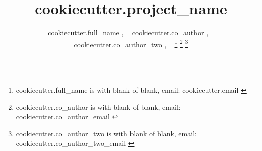 \title{ {{ cookiecutter.project_name }} }

\author{ {{ cookiecutter.full_name }}, ~
         {{ cookiecutter.co_author }}, ~
         {{ cookiecutter.co_author_two }}, ~%
\thanks{ {{ cookiecutter.full_name  }} is with blank of blank, email: {{ cookiecutter.email }}}%
\thanks{ {{ cookiecutter.co_author }} is with blank of blank, email: {{ cookiecutter.co_author_email }} }
\thanks{ {{ cookiecutter.co_author_two }} is with blank of blank, email: {{ cookiecutter.co_author_two_email }} }}

\date{}

